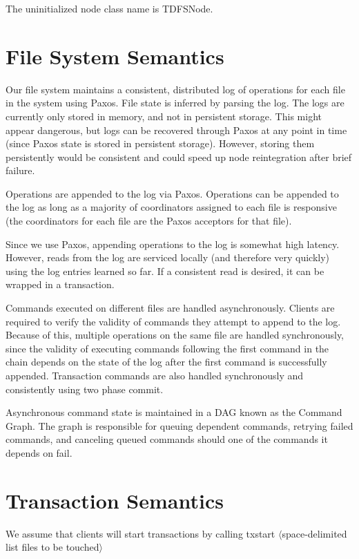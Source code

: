 \documentclass[11pt]{article}
\begin{document}
The uninitialized node class name is TDFSNode.

\section{File System Semantics} 

Our file system maintains a consistent, distributed log of operations for each file in the system using Paxos. File state is inferred by parsing the log.
The logs are currently only stored in memory, and not in persistent storage. This might appear dangerous, but logs can be recovered through Paxos at any point in time (since Paxos state is stored in persistent storage).  However, storing them persistently would be consistent and could speed up node reintegration after brief failure.

Operations are appended to the log via Paxos. Operations can be appended to the log as long as a majority of coordinators assigned to each file is responsive (the coordinators for each file are the Paxos acceptors for that file).

Since we use Paxos, appending operations to the log is somewhat high latency.
However, reads from the log are serviced locally (and therefore very quickly) using the log entries learned so far.
If a consistent read is desired, it can be wrapped in a transaction.

Commands executed on different files are handled asynchronously.
Clients are required to verify the validity of commands they attempt to append to the log. 
Because of this, multiple operations on the same file are handled synchronously, since the validity of executing commands
following the first command in the chain depends on the state of the log after the first command is successfully appended.
Transaction commands are also handled synchronously and consistently using two phase commit.

Asynchronous command state is maintained in a DAG known as the Command Graph.
The graph is responsible for queuing dependent commands, retrying failed commands, and canceling queued commands should one of the commands it depends on fail.

\section{Transaction Semantics}
We assume that clients will start transactions by calling txstart $\langle$space-delimited list files to be touched$\rangle$ %
\end{document}

